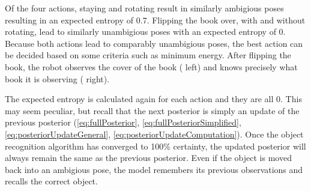         Of the four actions, staying and rotating result in similarly ambigious poses resulting in an expected entropy of $0.7$. Flipping the book over, with and without rotating, lead to similarly unambigious poses with an expected entropy of $0$. Because both actions lead to comparably unambigious poses, the best action can be decided based on some criteria such as minimum energy. After flipping the book, the robot observes the cover of the book ( left) and knows precisely what book it is observing ( right).

        The expected entropy is calculated again for each action and they are all $0$. This may seem peculiar, but recall that the next posterior is simply an update of the previous posterior (\eqref{eq:fullPosterior}, \eqref{eq:fullPosteriorSimplified}, \eqref{eq:posteriorUpdateGeneral}, \eqref{eq:posteriorUpdateComputation}). Once the object recognition algorithm has converged to 100\% certainty, the updated posterior will always remain the same as the previous posterior. Even if the object is moved back into an ambigious pose, the model remembers its previous observations and recalls the correct object. 

